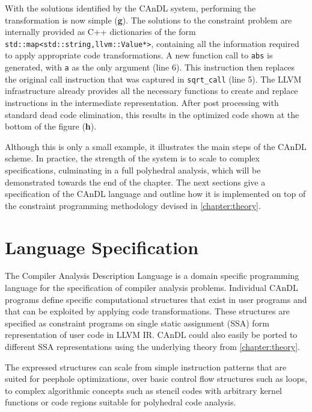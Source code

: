     With the solutions identified by the CAnDL system, performing the
    transformation is now simple ({\bf g}).
    The solutions to the constraint problem are internally provided as C++
    dictionaries of the form \texttt{std::map<std::string,llvm::Value*>},
    containing all the information required to apply appropriate code
    transformations.
    A new function call to \texttt{abs} is generated, with \texttt{a} as the
    only argument (line 6).
    This instruction then replaces the original call instruction that was
    captured in \texttt{sqrt\_call} (line 5).
    The LLVM infrastructure already provides all the necessary functions
    to create and replace instructions in the intermediate representation.
    After post processing with standard dead code elimination, this results in
    the optimized code shown at the bottom of the figure ({\bf h}).

    Although this is only a small example, it illustrates the main steps of the
    CAnDL scheme.
    In practice, the strength of the system is to scale to complex
    specifications, culminating in a full polyhedral analysis, which will be
    demonstrated towards the end of the chapter.
    The next sections give a specification of the CAnDL language and outline how
    it is implemented on top of the constraint programming methodology devised
    in \autoref{chapter:theory}.

\begin{figure}[p]
    
    \label{fig:candlexample}
\end{figure}

\section{Language Specification}

    The Compiler Analysis Description Language is a domain specific
    programming language for the specification of compiler analysis problems. 
    Individual CAnDL programs define specific computational structures that
    exist in user programs and that can be exploited by applying code
    transformations.
    These structures are specified as constraint programs on single static
    assignment (SSA) form representation of user code in LLVM IR.
    CAnDL could also easily be ported to different SSA representations using the
    underlying theory from \autoref{chapter:theory}.

    The expressed structures can scale from simple instruction patterns that are
    suited for peephole optimizations, over basic control flow structures such
    as loops, to complex algorithmic concepts such as stencil codes with
    arbitrary kernel functions or code regions suitable for polyhedral code
    analysis.

